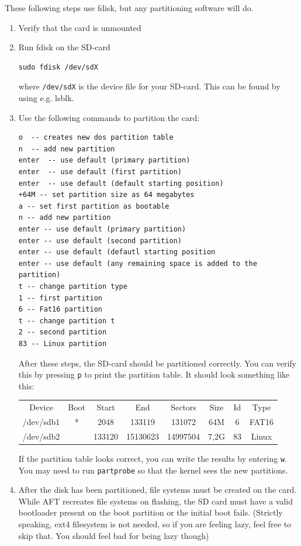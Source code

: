 \documentclass[a4paper,11pt]{article}
\newcommand{\cmd}[1]{\texttt{#1}}
\begin{document}
These following steps use fdisk, but any partitioning software will do.

\begin{enumerate}

\item Verify that the card is unmounted

\item Run fdisk on the SD-card

\begin{lstlisting}
sudo fdisk /dev/sdX
\end{lstlisting} 

where \cmd{/dev/sdX} is the device file for your SD-card. This can be found by using e.g. lsblk.

\item Use the following commands to partition the card:

\begin{lstlisting}
o  -- creates new dos partition table
n  -- add new partition
enter  -- use default (primary partition)
enter  -- use default (first partition)
enter  -- use default (default starting position)
+64M -- set partition size as 64 megabytes
a -- set first partition as bootable
n -- add new partition
enter -- use default (primary partition)
enter -- use default (second partition)
enter -- use default (defautl starting position
enter -- use default (any remaining space is added to the partition)
t -- change partition type
1 -- first partition 
6 -- Fat16 partition
t -- change partition t
2 -- second partition 
83 -- Linux partition
\end{lstlisting}

After these steps, the SD-card should be partitioned correctly. You can verify this by pressing \cmd{p} to print the partition table. It should look something like this:

\begin{tabular}{c c c c c c c c}
Device & Boot & Start & End & Sectors & Size & Id & Type \\
/dev/sdb1  & * & 2048 & 133119 & 131072 & 64M & 6 & FAT16 \\
/dev/sdb2  &   & 133120 & 15130623 & 14997504 & 7,2G & 83 & Linux \\
\end{tabular}

If the partition table looks correct, you can write the results by entering \cmd{w}. You may need to run \cmd{partprobe} so that the kernel sees the new partitions.

\item After the disk has been partitioned, file systems must be created on the card. While AFT recreates file systems on flashing, the SD card must have a valid bootloader present on the boot partition or the initial boot fails. (Strictly speaking, ext4 filesystem is not needed, so if you are feeling lazy, feel free to skip that. You should feel bad for being lazy though)


\end{enumerate}
\end{document}
